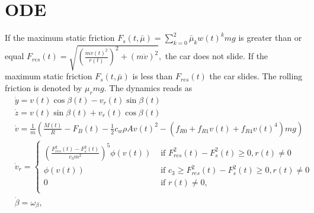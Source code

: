 \documentclass[
10pt, %
a4paper, %
oneside, %
headinclude,footinclude, %
BCOR5mm, %
]{scrartcl}
\begin{document}
\section{ODE}
If the maximum static friction $F_s(t, \bar{\mu}) = \sum_{k=0}^2 \bar{\mu}_k w(t)^k mg $ is greater than or equal $F_{res}(t) = \sqrt{\left(\frac{mv(t)^2}{r(t)}\right)^2+ \left(m \dot{v}\right)^2},$ the car does not slide. 
If the maximum static friction $F_s(t, \bar{\mu})$ is less than $F_{res}(t)$ the car slides. The rolling friction is denoted by $\mu_r m g.$
The dynamics reads as
\begin{align*}
 &\dot{y} = v(t) \cos\beta(t) -  v_r(t)\sin \beta(t) \\
& \dot{z} = v(t) \sin\beta(t) +  v_r(t)\cos \beta(t) \\
& \dot{v} = \frac{1}{m}\left( \frac{M(t)}{R} - F_B(t) - \frac{1}{2}  c_w  \rho  A v(t)^2 -\left(f_{R0} + f_{R1} v(t) + f_{R4}v(t)^4 \right) m g\right)\\
&  \dot{v}_r = \begin{cases} \left(\frac{F_{res}^2(t)- F_{s}^2(t)}{c_3m^2}\right)^5 \phi(v(t)) & \text{ if } F_{res}^2(t)- F_{s}^2(t)\geq 0, r(t) \neq 0\\
\phi( v(t))  & \text{ if } c_3 \geq F_{res}^2(t)- F_{s}^2(t) \geq 0, r(t) \neq 0\\
0 &   \text{ if } r(t) \neq 0,\\
\end{cases}\\
& \dot{\beta} = \omega_{\beta},
\end{align*}
\end{document}

